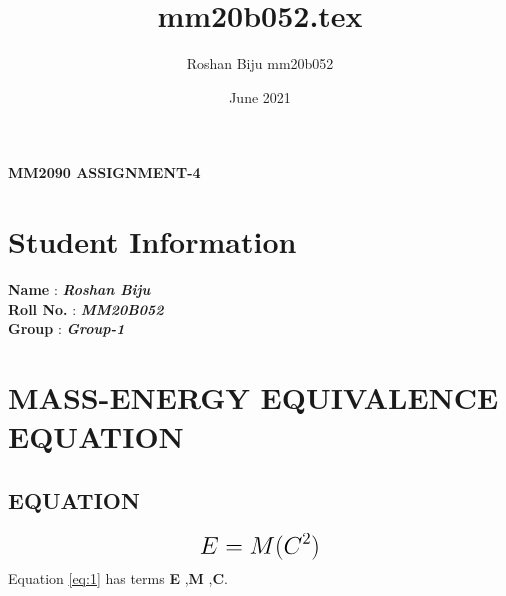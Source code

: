 \documentclass[a4paper, 12pt]{article}
\title{mm20b052.tex}
\author{Roshan Biju mm20b052}
\date{June 2021}
\begin{document}
\begin{center}
	{\LARGE {\textbf {MM2090 ASSIGNMENT-4}}}
\end{center}

\section{Student Information}
\textbf {Name} : \textbf{\textit {Roshan Biju}}\\
\textbf {Roll No.} : \textbf{\textit {MM20B052}}\\
\textbf {Group} : \textbf{\textit {Group-1}}
\section{MASS-ENERGY EQUIVALENCE EQUATION}
\subsection{EQUATION}
\begin{equation}
	{\LARGE{\textbf{$E=M(C^2)$}}}
	\label{eq:1}
\end{equation}
{\normalsize {Equation \ref{eq:1}  has terms \textbf{E} ,\textbf{M} ,\textbf{C}.}}
\end{document}

